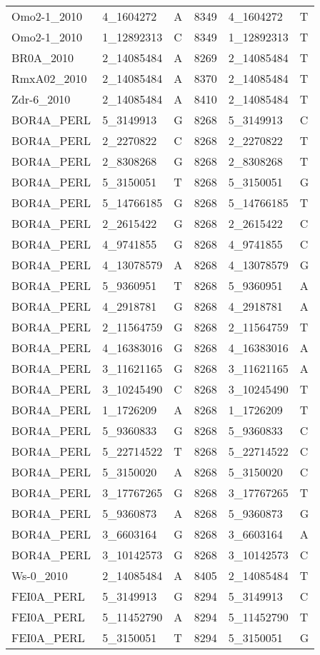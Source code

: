 \begin{center}
\begin{longtable}{|l|l|l|l|l|l|}
Omo2-1\_2010&4\_1604272&A&8349&4\_1604272&T\\
Omo2-1\_2010&1\_12892313&C&8349&1\_12892313&T\\
BR0A\_2010&2\_14085484&A&8269&2\_14085484&T\\
RmxA02\_2010&2\_14085484&A&8370&2\_14085484&T\\
Zdr-6\_2010&2\_14085484&A&8410&2\_14085484&T\\
BOR4A\_PERL&5\_3149913&G&8268&5\_3149913&C\\
BOR4A\_PERL&2\_2270822&C&8268&2\_2270822&T\\
BOR4A\_PERL&2\_8308268&G&8268&2\_8308268&T\\
BOR4A\_PERL&5\_3150051&T&8268&5\_3150051&G\\
BOR4A\_PERL&5\_14766185&G&8268&5\_14766185&T\\
BOR4A\_PERL&2\_2615422&G&8268&2\_2615422&C\\
BOR4A\_PERL&4\_9741855&G&8268&4\_9741855&C\\
BOR4A\_PERL&4\_13078579&A&8268&4\_13078579&G\\
BOR4A\_PERL&5\_9360951&T&8268&5\_9360951&A\\
BOR4A\_PERL&4\_2918781&G&8268&4\_2918781&A\\
BOR4A\_PERL&2\_11564759&G&8268&2\_11564759&T\\
BOR4A\_PERL&4\_16383016&G&8268&4\_16383016&A\\
BOR4A\_PERL&3\_11621165&G&8268&3\_11621165&A\\
BOR4A\_PERL&3\_10245490&C&8268&3\_10245490&T\\
BOR4A\_PERL&1\_1726209&A&8268&1\_1726209&T\\
BOR4A\_PERL&5\_9360833&G&8268&5\_9360833&C\\
BOR4A\_PERL&5\_22714522&T&8268&5\_22714522&C\\
BOR4A\_PERL&5\_3150020&A&8268&5\_3150020&C\\
BOR4A\_PERL&3\_17767265&G&8268&3\_17767265&T\\
BOR4A\_PERL&5\_9360873&A&8268&5\_9360873&G\\
BOR4A\_PERL&3\_6603164&G&8268&3\_6603164&A\\
BOR4A\_PERL&3\_10142573&G&8268&3\_10142573&C\\
Ws-0\_2010&2\_14085484&A&8405&2\_14085484&T\\
FEI0A\_PERL&5\_3149913&G&8294&5\_3149913&C\\
FEI0A\_PERL&5\_11452790&A&8294&5\_11452790&T\\
FEI0A\_PERL&5\_3150051&T&8294&5\_3150051&G\\

\end{longtable}
\end{center}

